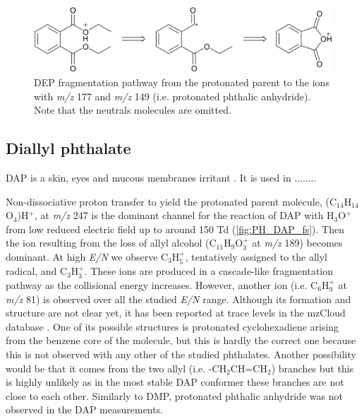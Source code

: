 \begin{figure}[htb]%
\centering
\includegraphics[height=0.1\textheight]{pics/PH/DEP_frag.png}
\caption{DEP fragmentation pathway from the protonated parent to the ions with \textit{m/z} 177 and \textit{m/z} 149 (i.e. protonated phthalic anhydride). Note that the neutrals molecules are omitted.}
\label{fig:PH_DEP_fr}
\end{figure}


\subsection{Diallyl phthalate}
DAP is a skin, eyes and mucous membranes irritant \cite{clayton1981patty}.
%
It is used in ........


Non-dissociative proton transfer to yield the protonated parent molecule, (C$_{14}$H$_{14}$O$_4$)H$^+$, at \textit{m/z} 247 is the dominant channel for the reaction of DAP with H$_3$O$^+$ from low reduced electric field up to around 150 Td (\autoref{fig:PH_DAP_fs}). Then the ion resulting from the loss of allyl alcohol (C$_{11}$H$_9$O$_3^+$ at \textit{m/z} 189) becomes dominant. At high \textit{E/N} we observe C$_3$H$_5^+$, tentatively assigned to  the allyl radical,  and C$_3$H$_3^+$.
%
These ions are produced in a cascade-like fragmentation pathway as the collisional energy increases.
%
However, another ion (i.e. C$_6$H$_9^+$ at \textit{m/z} 81) is observed over all the studied \textit{E/N} range.
%
Although its formation and structure are not clear yet, it has been reported at trace levels in the mzCloud database \cite{mzcloudDAP}.
%
One of its possible structures is protonated cyclohexadiene arising from the benzene core of the molecule, but this is hardly the correct one because this  is not observed with any other of the studied phthalates.
%
Another possibility would be that it comes from the two allyl (i.e. -CH$_2$CH=CH$_2$) branches but this is highly unlikely as in the most stable DAP conformer these branches are not close to each other.
%
Similarly to DMP, protonated phthalic anhydride was not observed in the DAP measurements.




